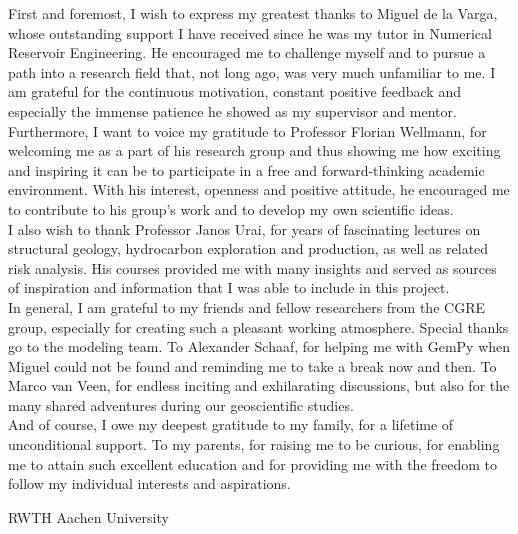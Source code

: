 \documentclass[a4paper,11pt]{MScThesis}
\begin{document}
    \cleardoublepage
%
    First and foremost, I wish to express my greatest thanks to Miguel de la Varga, whose outstanding support I have received since he was my tutor in Numerical Reservoir Engineering. He encouraged me to challenge myself and to pursue a path into a research field that, not long ago, was very much unfamiliar to me. I am grateful for the continuous motivation, constant positive feedback and especially the immense patience he showed as my supervisor and mentor.\\
    Furthermore, I want to voice my gratitude to Professor Florian Wellmann, for welcoming me as a part of his research group and thus showing me how exciting and inspiring it can be to participate in a free and forward-thinking academic environment. With his interest, openness and positive attitude, he encouraged me to contribute to his group's work and to develop my own scientific ideas.\\
    I also wish to thank Professor Janos Urai, for years of fascinating lectures on structural geology, hydrocarbon exploration and production, as well as related risk analysis. His courses provided me with many insights and served as sources of inspiration and information that I was able to include in this project.\\
    In general, I am grateful to my friends and fellow researchers from the CGRE group, especially for creating such a pleasant working atmosphere. Special thanks go to the modeling team. To Alexander Schaaf, for helping me with GemPy when Miguel could not be found and reminding me to take a break now and then. To Marco van Veen, for endless inciting and exhilarating discussions, but also for the many shared adventures during our geoscientific studies.\\
    And of course, I owe my deepest gratitude to my family, for a lifetime of unconditional support. To my parents, for raising me to be curious, for enabling me to attain such excellent education and for providing me with the freedom to follow my individual interests and aspirations.
    \vspace*{15mm}

    \noindent 
    RWTH Aachen University \hfill \mscname\\ %
    \mscdate

%
    \tocloflot
%
%
    \begin{acronym}%
    \end{acronym}%
    \cleardoublepage%
%
%
%
\mainmatter
%
\end{document}
